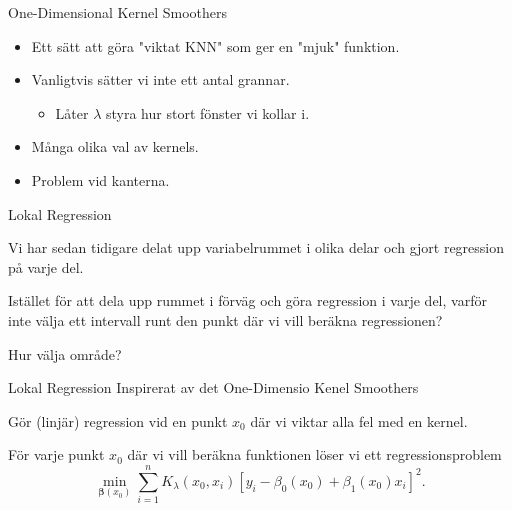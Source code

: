 \documentclass[10pt,english]{beamer}
\begin{document}
\begin{frame}{One-Dimensional Kernel Smoothers}

    \begin{itemize}
        \item Ett sätt att göra "viktat KNN" som ger en "mjuk" funktion.
        \item Vanligtvis sätter vi inte ett antal grannar.
        \begin{itemize}
            \item Låter $\lambda$ styra hur stort fönster vi kollar i.
        \end{itemize}
        \item Många olika val av kernels.
        \item Problem vid kanterna.
    \end{itemize}
    
\end{frame}

\begin{frame}{Lokal Regression}

    Vi har sedan tidigare delat upp variabelrummet i olika delar och gjort regression på varje del.

    Istället för att dela upp rummet i förväg och göra regression i varje del, varför inte välja ett intervall runt den punkt där vi vill beräkna regressionen?

    Hur välja område?
    
\end{frame}

\begin{frame}{Lokal Regression}
    Inspirerat av det One-Dimensio Kenel Smoothers
    \begin{greenbox}
        Gör (linjär) regression vid en punkt $x_0$ där vi viktar alla fel med en kernel.
    \end{greenbox}

    För varje punkt $x_0$ där vi vill beräkna funktionen löser vi ett regressionsproblem
    \begin{equation*}
        \min_{\mathbf{\beta}(x_0)} \sum_{i=1}^{n} K_{\lambda}(x_0, x_i) [y_i - \beta_0(x_0) + \beta_1(x_0) x_i]^2.
    \end{equation*}

\end{frame}
\end{document}
